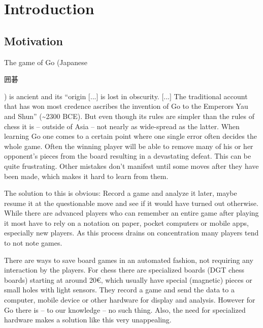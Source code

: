 
\chapter{Introduction}
	\section{Motivation}
	\label{introduction-motivation}
	The game of Go (Japanese \begingroup\setmainfont{Droid Sans Japanese}\small\begin{CJK}{UTF8}{min}囲碁\end{CJK}\endgroup ) is ancient and its ``origin [...] is lost in obscurity. [...] The traditional account that has won most credence ascribes the invention of Go to the Emperors Yau and Shun''\cite{mihori1939japanese} (\textasciitilde 2300 BCE). But even though its rules are simpler than the rules of chess it is -- outside of Asia -- not nearly as wide-spread as the latter. When learning Go one comes to a certain point where one single error often decides the whole game. Often the winning player will be able to remove many of his or her opponent's pieces from the board resulting in a devastating defeat. This can be quite frustrating. Other mistakes don't manifest until some moves after they have been made, which makes it hard to learn from them.

	The solution to this is obvious: Record a game and analyze it later, maybe resume it at the questionable move and see if it would have turned out otherwise. While there are advanced players who can remember an entire game after playing it most have to rely on a notation on paper, pocket computers or mobile apps, especially new players. As this process drains on concentration many players tend to not note games.

	There are ways to save board games in an automated fashion, not requiring any interaction by the players. For chess there are specialized boards (DGT chess boards) starting at around 20€, which usually have special (magnetic) pieces\cite{bulsink2001device} or small holes with light sensors. They record a game and send the data to a computer, mobile device or other hardware for display and analysis. However for Go there is -- to our knowledge -- no such thing. Also, the need for specialized hardware makes a solution like this very unappealing.

